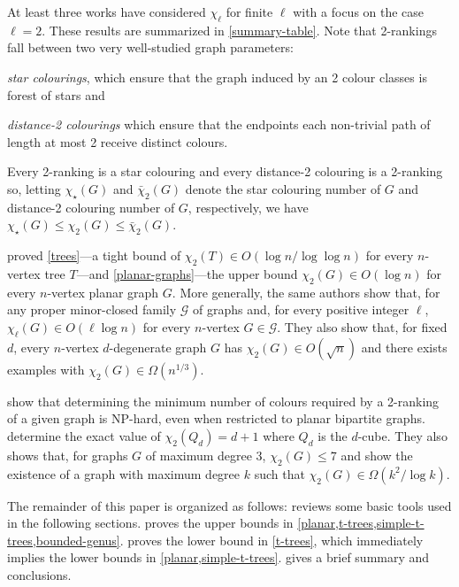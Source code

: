 \documentclass[kpfonts]{patmorin}
\newcommand{\trn}{\chi_2}
\newcommand{\dtcn}{\bar{\chi}_2}
\newcommand{\scn}{\chi_{\star}}
\theoremstyle{named}
\begin{document}
At least three works have considered $\chi_\ell$ for finite $\ell$ with a focus on the case $\ell=2$.  These results are summarized in \cref{summary-table}.  Note that 2-rankings fall between two very well-studied graph parameters:
\begin{compactitem}
    \item \emph{star colourings}, which ensure that the graph induced by an 2 colour classes is forest of stars and
    \item \emph{distance-2 colourings} which ensure that the endpoints each non-trivial path of length at most 2 receive distinct colours.
\end{compactitem}
Every 2-ranking is a star colouring and every distance-2 colouring is a 2-ranking so, letting $\scn(G)$ and $\dtcn(G)$ denote the star colouring number of $G$ and distance-2 colouring number of $G$, respectively, we have $\scn(G) \le \trn(G)\le \dtcn(G)$.

\citet{karpas.neiman.ea:on} proved \cref{trees}---a tight bound of $\trn(T)\in O(\log n/\log\log n)$ for every $n$-vertex tree $T$---and \cref{planar-graphs}---the upper bound $\trn(G)\in O(\log n)$ for every $n$-vertex planar graph $G$.  More generally, the same authors show that, for any proper minor-closed family $\mathcal{G}$ of graphs and, for every positive integer $\ell$, $\chi_\ell(G)\in O(\ell\log n)$ for every $n$-vertex $G\in\mathcal{G}$.  They also show that, for fixed $d$, every $n$-vertex $d$-degenerate graph $G$ has $\trn(G)\in O(\sqrt{n})$ and there exists examples with $\trn(G)\in\Omega(n^{1/3})$.

\citet{shalu.antony:complexity} show that determining the minimum number of colours required by a 2-ranking of a given graph is NP-hard, even when restricted to planar bipartite graphs.  \citet{almeter.demircan.ea:graph} determine the exact value of $\trn(Q_d)=d+1$ where $Q_d$ is the $d$-cube.  They also shows that, for graphs $G$ of maximum degree 3, $\trn(G)\le 7$ and show the existence of a graph with maximum degree $k$ such that $\trn(G)\in\Omega(k^2/\log k)$.

The remainder of this paper is organized as follows:  reviews some basic tools used in the following sections.  proves the upper bounds in \cref{planar,t-trees,simple-t-trees,bounded-genus}.   proves the lower bound in \cref{t-trees}, which immediately implies the lower bounds in \cref{planar,simple-t-trees}.  gives a brief summary and conclusions.
\end{document}

